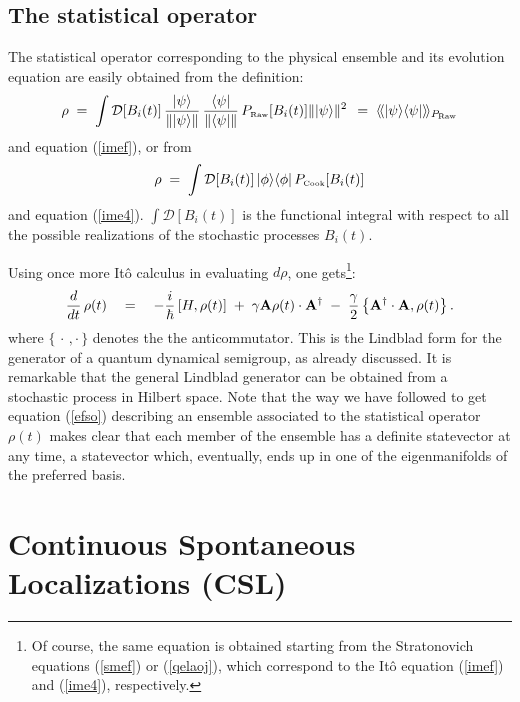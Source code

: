 \documentclass[12pt]{article}
\newcommand{\llangle}{\langle\!\langle}
\newcommand{\rrangle}{\rangle\!\rangle}
\begin{document}
\subsection{The statistical operator} \label{sec65}

The statistical operator corresponding to the physical ensemble
and its evolution equation are easily obtained from the
definition:
\begin{equation} \label{hjkg}
\rho \; = \;  \int {\mathcal D}[B_{i}(t)]\, \frac{|\psi\rangle}{\|
|\psi\rangle \|}\, \frac{\langle \psi|}{\|\langle\psi|\|}\,
P_{\makebox{\tiny Raw}}[B_{i}(t)]\| | \psi\rangle \|^{2}\, \; = \;
\llangle |\psi \rangle \langle \psi| \rrangle_{P_{\makebox{\tiny
Raw}}}
\end{equation}
and equation (\ref{imef}), or from
\begin{equation}
\rho \; = \; \int {\mathcal D}[B_{i}(t)]\, |\phi \rangle\langle
\phi|\, P_{\makebox{\tiny Cook}}[B_{i}(t)]
\end{equation}
and equation (\ref{ime4}). $\int {\mathcal D}[B_{i}(t)]$ is the
functional integral with respect to all the possible realizations
of the stochastic processes $B_{i}(t)$.

Using once more It\^o calculus in evaluating $d\rho$, one
gets\footnote{Of course, the same equation is obtained starting
from the Stratonovich equations (\ref{smef}) or (\ref{qelaoj}),
which correspond to the It\^o equation (\ref{imef}) and
(\ref{ime4}), respectively.}:
\begin{equation} \label{efso}
\frac{d}{dt}\, \rho(t) \quad = \quad -\frac{i}{\hbar}\, [H,
\rho(t)] \; + \; \gamma {\bf A} \rho(t)\cdot {\bf A}^{\dagger} \;
- \; \frac{\gamma}{2} \left\{ {\bf A}^{\dagger}\cdot {\bf A},
\rho(t) \right\}.
\end{equation}
where $\{ \, \cdot \, ,\cdot \, \}$ denotes the the
anticommutator. This is the Lindblad  form for the generator of a
quantum dynamical semigroup, as already discussed. It is
remarkable that the general Lindblad generator can be obtained
from a stochastic process in Hilbert space. Note that the way we
have followed to get equation (\ref{efso}) describing an ensemble
associated to the statistical operator $\rho \! \left( t \right)$
makes clear that each member of the ensemble has a definite
statevector at any time, a statevector which, eventually, ends up
in one of the eigenmanifolds of the preferred basis.



\section{Continuous Spontaneous Localizations (CSL)} \label{sec7}
\end{document}
